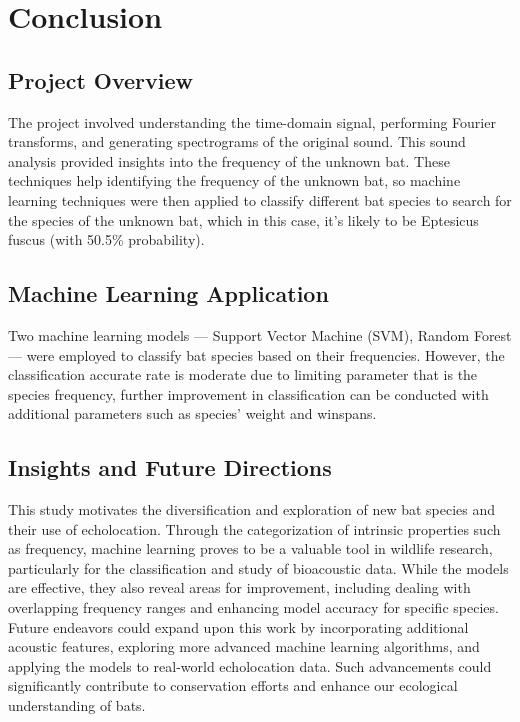 \documentclass[twocolumn]{article}[ht]
\begin{document}
\section{Conclusion}

\subsection{Project Overview}
The project involved understanding the time-domain signal, performing Fourier transforms, and generating spectrograms of the original sound. This sound analysis provided insights into the frequency of the unknown bat. These techniques help identifying the frequency of the unknown bat, so machine learning techniques were then applied to classify different bat species to search for the species of the unknown bat, which in this case, it's likely to be Eptesicus fuscus (with 50.5\% probability).
\subsection{Machine Learning Application}
Two machine learning models — Support Vector Machine (SVM), Random Forest — were employed to classify bat species based on their frequencies. However, the classification accurate rate is moderate due to limiting parameter that is the species frequency, further improvement in classification can be conducted with additional parameters such as species' weight and winspans.
\subsection{Insights and Future Directions}
This study motivates the diversification and exploration of new bat species and their use of echolocation. Through the categorization of intrinsic properties such as frequency, machine learning proves to be a valuable tool in wildlife research, particularly for the classification and study of bioacoustic data. While the models are effective, they also reveal areas for improvement, including dealing with overlapping frequency ranges and enhancing model accuracy for specific species. Future endeavors could expand upon this work by incorporating additional acoustic features, exploring more advanced machine learning algorithms, and applying the models to real-world echolocation data. Such advancements could significantly contribute to conservation efforts and enhance our ecological understanding of bats.
\end{document}
